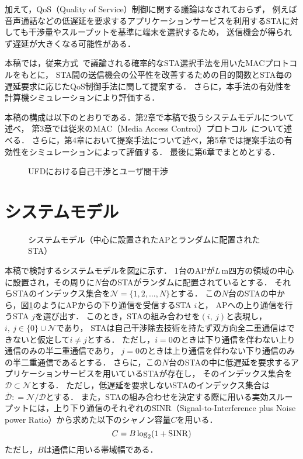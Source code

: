 \documentclass[technicalreport]{ieicej}
\newcommand{\sij}{(i,\ j)}
\newcommand{\mN}{{\mathcal N}}
\def\coloneqq{\mathrel{\mathop:}=}
\begin{document}
	加えて，QoS（Quality of Service）制御に関する議論はなされておらず，
	例えば音声通話などの低遅延を要求するアプリケーションサービスを利用するSTAに対しても干渉量やスループットを基準に端末を選択するため，
	送信機会が得られず遅延が大きくなる可能性がある．
	\par
	本稿では，従来方式~\cite{promac}で議論される確率的なSTA選択手法を用いたMACプロトコルをもとに，
	STA間の送信機会の公平性を改善するための目的関数とSTA毎の遅延要求に応じたQoS制御手法に関して提案する．
	さらに，本手法の有効性を計算機シミュレーションにより評価する．
	\par
	本稿の構成は以下のとおりである．第2章で本稿で扱うシステムモデルについて述べ，
	第3章では従来のMAC（Media Access Control）プロトコル~\cite{promac}について述べる．
	さらに，第4章において提案手法について述べ，第5章では提案手法の有効性をシミュレーションによって評価する．
	最後に第6章でまとめとする．

	\begin{figure}[t]
		\centering
		\caption{UFDにおける自己干渉とユーザ間干渉}
		\label{fig:topology}
	\end{figure}

\section{システムモデル}
	\begin{figure}[t]
		\centering
		\caption{システムモデル（中心に設置されたAPとランダムに配置されたSTA）}
		\label{fig:model}
	\end{figure}

	本稿で検討するシステムモデルを図\ref{fig:model}に示す．
	1台のAPが$L$\,m四方の領域の中心に設置され，その周りに$N$台のSTAがランダムに配置されているとする．
	それらSTAのインデックス集合を$\mN=\{1,2,...,N\}$とする．
	この$N$台のSTAの中から，図\ref{fig:topology}のようにAPからの下り通信を受信するSTA $i$と，
	APへの上り通信を行うSTA $j$を選び出す．
	このとき，STAの組み合わせを$\sij$と表現し，$i,\ j \in \{0\}\cup \mN$であり，
	STAは自己干渉除去技術を持たず双方向全二重通信はできないと仮定して$i\neq j$とする．
	ただし，$i=0$のときは下り通信を伴わない上り通信のみの半二重通信であり，
	$j=0$のときは上り通信を伴わない下り通信のみの半二重通信であるとする．
	さらに，この$N$台のSTAの中に低遅延を要求するアプリケーションサービスを用いているSTAが存在し，
	そのインデックス集合を${\mathcal D}\subset\mN$とする．
	ただし，低遅延を要求しないSTAのインデックス集合は${\overline {\mathcal D}}\coloneqq{\mathcal N}/{\mathcal D}$とする．
	また，STAの組み合わせを決定する際に用いる実効スループットには，上り下り通信のそれぞれのSINR（Signal-to-Interference plus Noise power Ratio）から求めた以下のシャノン容量$C$を用いる．
	\begin{equation}
		C=B\log_2(1+{\rm SINR}) \label{eq:capacity}
	\end{equation}
	ただし，$B$は通信に用いる帯域幅である．
\end{document}
